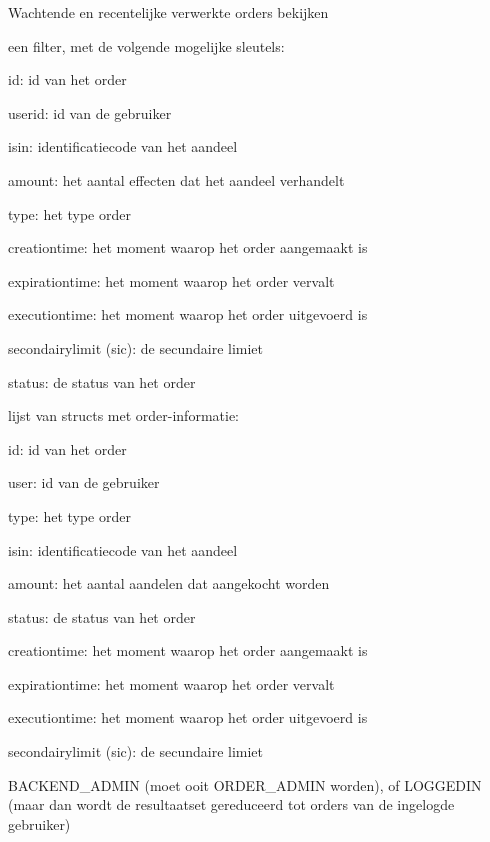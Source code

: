 	{ Wachtende en recentelijke verwerkte orders bekijken }
	{ een filter, met de volgende mogelijke sleutels:
		\begin{itemize_compact}
		\item{id: id van het order}
		\item{userid: id van de gebruiker}
		\item{isin: identificatiecode van het aandeel}
		\item{amount: het aantal effecten dat het aandeel verhandelt}
		\item{type: het type order}
		\item{creationtime: het moment waarop het order aangemaakt is}
		\item{expirationtime: het moment waarop het order vervalt}
		\item{executiontime: het moment waarop het order uitgevoerd is}
		\item{secondairylimit (sic): de secundaire limiet}
		\item{status: de status van het order}
		\end{itemize_compact} }
	{ lijst van structs met order-informatie:
		\begin{itemize_compact}
		\item{id: id van het order}
		\item{user: id van de gebruiker}
		\item{type: het type order}
		\item{isin: identificatiecode van het aandeel}
		\item{amount: het aantal aandelen dat aangekocht worden}
		\item{status: de status van het order}
		\item{creationtime: het moment waarop het order aangemaakt is}
		\item{expirationtime: het moment waarop het order vervalt}
		\item{executiontime: het moment waarop het order uitgevoerd is}
		\item{secondairylimit (sic): de secundaire limiet}
		\end{itemize_compact} }
	{ BACKEND\_ADMIN (moet ooit ORDER\_ADMIN worden), of LOGGEDIN (maar dan wordt de resultaatset gereduceerd tot orders van de ingelogde gebruiker) }


